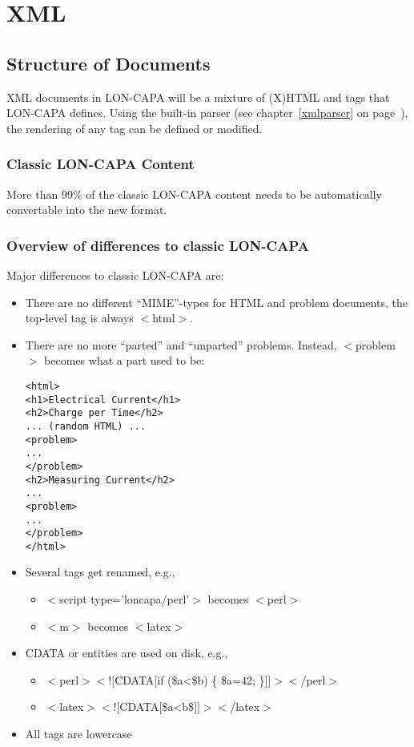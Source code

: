\chapter{XML}
\section{Structure of Documents}
XML documents in LON-CAPA will be a mixture of (X)HTML and tags that LON-CAPA defines. Using the built-in parser (see chapter~\ref{xmlparser} on page~\pageref{xmlparser}), the rendering of any tag can be defined or modified.
\subsection{Classic LON-CAPA Content}
More than 99\% of the classic LON-CAPA content needs to be automatically convertable into the new format.
\subsection{Overview of differences to classic LON-CAPA}
Major differences to classic LON-CAPA are:
\begin{itemize}
\item There are no different ``MIME''-types for HTML and problem documents, the top-level tag is always $<$html$>$.
\item There are no more ``parted'' and ``unparted'' problems. Instead, $<$problem$>$ becomes what a part used to be:
\begin{verbatim}
<html>
<h1>Electrical Current</h1>
<h2>Charge per Time</h2>
... (random HTML) ...
<problem>
...
</problem>
<h2>Measuring Current</h2>
...
<problem>
...
</problem>
</html>
\end{verbatim}
\item Several tags get renamed, e.g.,
\begin{itemize}
\item $<$script type='loncapa/perl'$>$ becomes $<$perl$>$
\item $<$m$>$ becomes $<$latex$>$
\end{itemize}
\item CDATA or entities are used on disk, e.g.,
\begin{itemize}
\item $<$perl$><![$CDATA$[$if (\$a<\$b) \{ \$a=42; \}$]]><$/perl$>$
\item $<$latex$><![$CDATA$[$\$a<b\$$]]><$/latex$>$
\end{itemize}
\item All tags are lowercase
\end{itemize}
